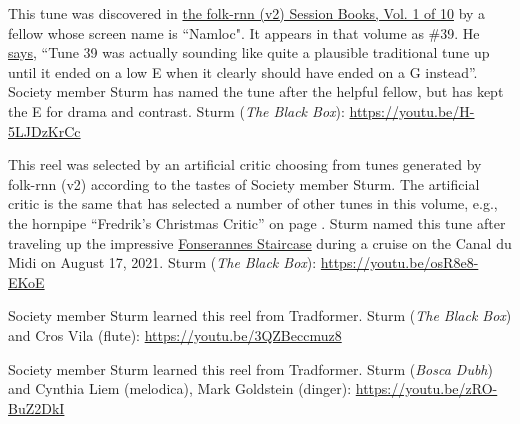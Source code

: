 \documentclass[a4paper,notitlepage,twoside]{book}
\begin{document}
{}  
  
\hypertarget{reel:Namlocs}{}
This tune was discovered in \href{https://highnoongmt.wordpress.com/2018/01/05/volumes-1-20-of-folk-rnn-v1-transcriptions}{the folk-rnn (v2) Session Books, Vol. 1 of 10}
by a fellow whose screen name is ``Namloc". 
It appears in that volume as \#39. 
He \href{https://thesession.org/discussions/39604}{says}, ``Tune 39 was actually sounding 
like quite a plausible traditional tune up until it ended on a low E 
when it clearly should have ended on a G instead''. 
Society member Sturm has named the tune after the helpful fellow, 
but has kept the E for drama and contrast.
Sturm ({\em The Black Box}): \url{https://youtu.be/H-5LJDzKrCc}

{}
\hypertarget{reel:FonserannesStaircase}{}
This reel was selected by an artificial critic choosing from tunes generated by folk-rnn (v2)
according to the tastes of Society member Sturm.
The artificial critic is the same that has selected a number of other tunes in this volume, 
e.g., the hornpipe ``Fredrik's Christmas Critic'' on page \pageref{hornpipe:FredriksChristmasCritic}.
Sturm named this tune after traveling up the impressive 
\href{https://en.wikipedia.org/wiki/Fonseranes_Locks}{Fonserannes Staircase} during a 
cruise on the Canal du Midi on August 17, 2021.
Sturm ({\em The Black Box}): \url{https://youtu.be/osR8e8-EKoE}

{}
\hypertarget{reel:PromenadeinG}{}
Society member Sturm learned this reel from Tradformer.
Sturm ({\em The Black Box}) and Cros Vila (flute): \url{https://youtu.be/3QZBeccmuz8}

{}
\hypertarget{reel:PingtheKvetch}{}
Society member Sturm learned this reel from Tradformer.
Sturm ({\em Bosca Dubh}) and Cynthia Liem (melodica), Mark Goldstein (dinger): \url{https://youtu.be/zRO-BuZ2DkI}
\end{document}
